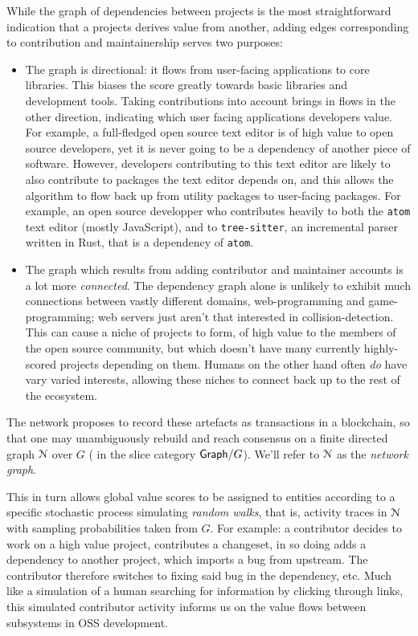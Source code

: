 While the graph of dependencies between projects is the most straightforward
indication that a projects derives value from another, adding edges corresponding
to contribution and maintainership serves two purposes:
\begin{itemize}
\item The graph is directional: it flows from user-facing applications to core
  libraries. This biases the score greatly towards basic libraries and
  development tools. Taking contributions into account brings in flows in the
  other direction, indicating which user facing applications developers
  value. For example, a full-fledged open source text editor is of high value
  to open source developers, yet it is never going to be a dependency of
  another piece of software. However, developers contributing to this text
  editor are likely to also contribute to packages the text editor depends
  on, and this allows the algorithm to flow back up from utility packages to
  user-facing packages. For example, an open source developper who
  contributes heavily to both the \texttt{atom} text editor (mostly
  JavaScript), and to \texttt{tree-sitter}, an incremental parser written in
  Rust, that is a dependency of \texttt{atom}.
\item The graph which results from adding contributor and maintainer accounts
  is a lot more \emph{connected}. The dependency graph alone is unlikely to
  exhibit much connections between vastly different domains, \eg{}
  web-programming and game-programming; web servers just aren't that
  interested in collision-detection. This can cause a niche of projects to
  form, of high value to the members of the open source community, but which
  doesn't have many currently highly-scored projects depending on them.
  Humans on the other hand often \emph{do} have vary varied interests,
  allowing these niches to connect back up to the rest of the ecosystem.
\end{itemize}
The \oscoin{} network proposes to record these artefacts as
transactions in a blockchain, so that one may unambiguously rebuild
and reach consensus on a finite directed graph $\mathcal{N}$ over $G$
(\ie{} in the slice category $\mathsf{Graph}/G$). We'll refer to $\mathcal{N}$
as the \emph{network graph}.

This in turn allows global value scores to be assigned to entities
according to a specific stochastic process simulating \emph{random
  walks}, that is, activity traces in $\mathcal{N}$ with sampling
probabilities taken from $G$. For example: a contributor decides to
work on a high value project, contributes a changeset, in so doing adds a
dependency to another project, which imports a bug from upstream. The
contributor therefore switches to fixing said bug in the dependency, etc. Much
like a simulation of a human searching for information by clicking through
links, this simulated contributor activity informs us on the value flows
between subsystems in OSS development.

